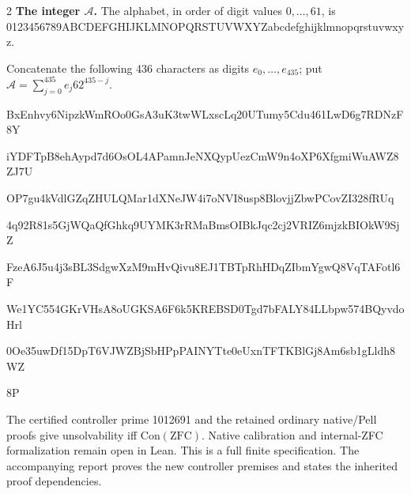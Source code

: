 \documentclass[10pt]{article}
\begin{document}
\begin{multicols}{2}
\textbf{The integer $\mathcal A$.}
The alphabet, in order of digit values $0,\ldots,61$, is
{\fontsize{7.7}{8.2}\selectfont\ttfamily 0123456789ABCDEFGHIJKLMNOPQRSTUVWXYZabcdefghijklmnopqrstuvwxyz}.\par
Concatenate the following 436 characters as digits $e_0,\ldots,e_{435}$;
put $\mathcal A=\sum_{j=0}^{435}e_j62^{435-j}$.\par
\begingroup\fontsize{7.7}{8.2}\selectfont\ttfamily
BxEnhvy6NipzkWmROo0GsA3uK3twWLxscLq20UTumy5Cdu461LwD6g7RDNzF8Y\par
iYDFTpB8ehAypd7d6OsOL4APamnJeNXQypUezCmW9n4oXP6XfgmiWuAWZ8ZJ7U\par
OP7gu4kVdlGZqZHULQMar1dXNeJW4i7oNVI8usp8BlovjjZbwPCovZI328fRUq\par
4q92R81s5GjWQaQfGhkq9UYMK3rRMaBmsOIBkJqc2cj2VRIZ6mjzkBIOkW9SjZ\par
FzeA6J5u4j3sBL3SdgwXzM9mHvQivu8EJ1TBTpRhHDqZIbmYgwQ8VqTAFotl6F\par
We1YC554GKrVHsA8oUGKSA6F6k5KREBSD0Tgd7bFALY84LLbpw574BQyvdoHrl\par
0Oe35uwDf15DpT6VJWZBjSbHPpPAINYTte0eUxnTFTKBlGj8Am6sb1gLldh8WZ\par
8P\par
\endgroup
\normalfont\fontsize{7.7}{8.2}\selectfont
The certified controller prime 1012691 and the retained ordinary native/Pell proofs give
unsolvability iff $\mathrm{Con}(\mathrm{ZFC})$.
Native calibration and internal-ZFC formalization remain open in Lean.
This is a full finite specification. The accompanying report proves the new controller premises and states the inherited proof dependencies.
\end{multicols}
\end{document}
